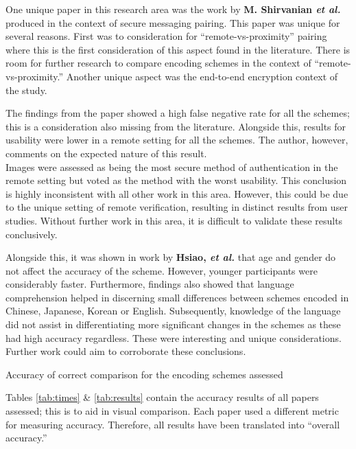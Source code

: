 One unique paper in this research area was the work by \textbf{M. Shirvanian \textit{et al.}}\cite{shirvanian2017pitfalls} produced in the context of secure messaging pairing. This paper was unique for several reasons. First was to consideration for ``remote-vs-proximity'' pairing where this is the first consideration of this aspect found in the literature. There is room for further research to compare encoding schemes in the context of ``remote-vs-proximity.'' Another unique aspect was the end-to-end encryption context of the study.

The findings from the paper showed a high false negative rate for all the schemes; this is a consideration also missing from the literature. Alongside this, results for usability were lower in a remote setting for all the schemes. The author, however, comments on the expected nature of this result.\\
Images were assessed as being the most secure method of authentication in the remote setting but voted as the method with the worst usability. This conclusion is highly inconsistent with all other work in this area. However, this could be due to the unique setting of remote verification, resulting in distinct results from user studies. Without further work in this area, it is difficult to validate these results conclusively.

Alongside this, it was shown in work by \textbf{Hsiao, \textit{et al.}}\cite{hsiao2009study} that age and gender do not affect the accuracy of the scheme. However, younger participants were considerably faster. Furthermore, findings also showed that language comprehension helped in discerning small differences between schemes encoded in Chinese, Japanese, Korean or English. Subsequently, knowledge of the language did not assist in differentiating more significant changes in the schemes as these had high accuracy regardless. These were interesting and unique considerations. Further work could aim to corroborate these conclusions.

\begin{table}[h!]
    \makebox[\textwidth][c]{
        
    }%
    \caption{Accuracy of correct comparison for the encoding schemes assessed}
    \label{tab:results}
\end{table}

Tables \ref{tab:times} \& \ref{tab:results} contain the accuracy results of all papers assessed; this is to aid in visual comparison. Each paper used a different metric for measuring accuracy. Therefore, all results have been translated into ``overall accuracy.''

